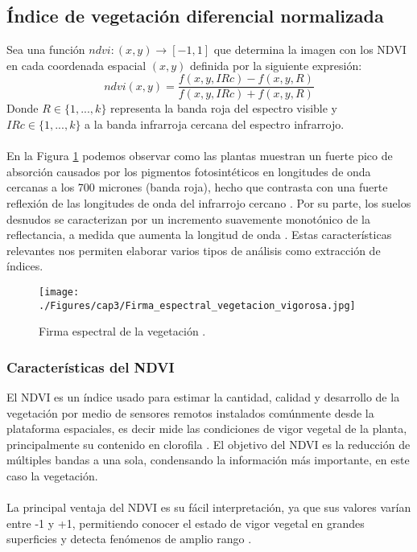 \subsection{\'Indice de vegetaci\'on diferencial normalizada}\label{subsec:ndvi}
Sea una funci\'on $ ndvi:(x,y) \longrightarrow [-1,1] $ que determina la imagen con los NDVI en cada coordenada espacial $ (x,y) $ definida por la siguiente expresi\'on:
\begin{equation}
\label{e:ndvi}
ndvi(x,y)=\dfrac{f(x,y,IRc)-f(x,y,R)}{f(x,y,IRc)+f(x,y,R)}
\end{equation}
Donde $ R \in \{1,...,k\}$ representa la banda roja del espectro visible y  $ IRc \in \{1,...,k\}$ a la banda infrarroja cercana del espectro infrarrojo.\\~\\
En la Figura \ref{fig:firmaVegetacion} podemos observar como las plantas muestran un fuerte pico de absorci\'on causados por los pigmentos fotosint\'eticos en longitudes de onda cercanas a los 700 micrones (banda roja), hecho que contrasta con una fuerte reflexi\'on de las longitudes de onda del infrarrojo cercano \cite{salinero2002teledeteccion}. Por su parte, los suelos desnudos se caracterizan por un incremento suavemente monot\'onico de la reflectancia, a medida que aumenta la longitud de onda \cite{salinero2002teledeteccion}. Estas caracter\'isticas relevantes nos permiten elaborar varios tipos de an\'alisis como extracci\'on de \'indices.
\begin{figure}[H]
	\centering
	\texttt{[image: ./Figures/cap3/Firma\_espectral\_vegetacion\_vigorosa.jpg]}
	\caption{Firma espectral de la vegetaci\'on \cite{ndvi2015com}.}
	\label{fig:firmaVegetacion}
\end{figure}

\subsubsection{Caracter\'isticas del NDVI}\label{subsec:subndvi}
El NDVI es un \'indice usado para estimar la cantidad, calidad y desarrollo de la vegetaci\'on por medio de sensores remotos instalados com\'unmente desde la plataforma espaciales, es decir mide las condiciones de vigor vegetal de la planta, principalmente su contenido en clorofila \cite{salinero2002teledeteccion}. El objetivo del NDVI es la reducci\'on de m\'ultiples bandas a una sola, condensando la informaci\'on m\'as importante, en este caso la vegetaci\'on.\\~\\
La principal ventaja del NDVI es su f\'acil interpretaci\'on, ya que sus valores var\'ian entre -1 y +1, permitiendo conocer el estado de vigor vegetal en grandes superficies y detecta fen\'omenos de amplio rango \cite{salinero2002teledeteccion}.

